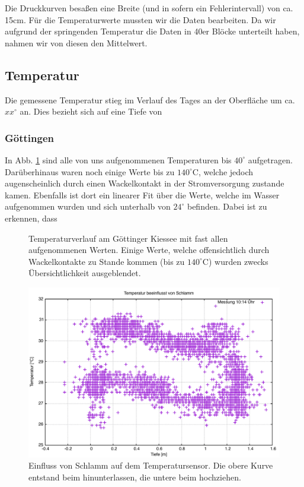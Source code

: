 \documentclass[12pt,a4paper,titlepage,headinclude,bibtotoc]{scrartcl}
\numberwithin{equation}{subsection}
\begin{document}
Die Druckkurven besaßen eine Breite (und in sofern ein Fehlerintervall) von ca. 15cm.
Für die Temperaturwerte mussten wir die Daten bearbeiten.
Da wir aufgrund der springenden Temperatur die Daten in 40er Blöcke unterteilt haben, nahmen wir von diesen den Mittelwert.


\subsection{Temperatur}
Die gemessene Temperatur stieg im Verlauf des Tages an der Oberfläche um ca. $xx^\circ$ an.
Dies bezieht sich auf eine Tiefe von  

\subsubsection{Göttingen}
In Abb. \ref{fig:temp_goe} sind alle von uns aufgenommenen Temperaturen bis $40^\circ$ aufgetragen.
Darüberhinaus waren noch einige Werte bis zu $140^\circ$C, welche jedoch augenscheinlich durch einen Wackelkontakt in der Stromversorgung zustande kamen.
Ebenfalls ist dort ein linearer Fit über die Werte, welche im Wasser aufgenommen wurden und sich unterhalb von $24^\circ$ befinden.
Dabei ist zu erkennen, dass

\begin{figure}[h]
\centering

\caption{Temperaturverlauf am Göttinger Kiessee mit fast allen aufgenommenen Werten. Einige Werte, welche offensichtlich durch Wackelkontakte zu Stande kommen (bis zu $140^\circ$C) wurden zwecks Übersichtlichkeit ausgeblendet.}
\label{fig:temp_goe}
\end{figure}
\begin{figure}[h]
	\centering
	\includegraphics{TempSchlamm}
	\caption{Einfluss von Schlamm auf dem Temperatursensor. Die obere Kurve entstand beim hinunterlassen, die untere beim hochziehen.}
	\label{fig:tempSchlamm}
\end{figure}
\end{document}
